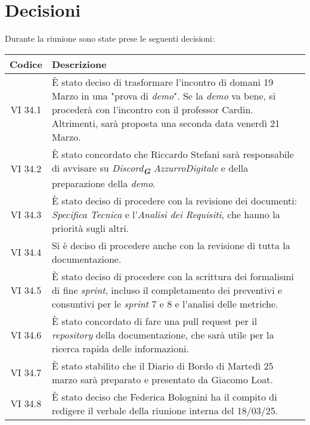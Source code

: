 
\section{Decisioni}

Durante la riunione sono state prese le seguenti decisioni:

\vspace{0.5cm}

\begin{table}[htbp]
    \centering
    \begin{tabular}{|c|p{}|}
        \hline
        \rowcolor[gray]{0.75}
        \textbf{Codice} & \textbf{Descrizione}\\
        \hline
        VI 34.1 & È stato deciso di trasformare l'incontro di domani 19 Marzo in una "prova di \emph{demo}". Se la \emph{demo} va bene, si procederà con l'incontro con il professor Cardin. Altrimenti, sarà proposta una seconda data venerdì 21 Marzo.\\
        \hline
        VI 34.2 & È stato concordato che Riccardo Stefani sarà responsabile di avvisare su \emph{Discord}\textsubscript{\textit{\textbf{G}}} \emph{AzzurroDigitale} e della preparazione della \emph{demo}.\\
        \hline
        VI 34.3 & È stato deciso di procedere con la revisione dei documenti: \emph{Specifica Tecnica} e l'\emph{Analisi dei Requisiti}, che hanno la priorità sugli altri.\\
        \hline 
        VI 34.4 & Si è deciso di procedere anche con la revisione di tutta la documentazione.\\
        \hline
        VI 34.5 & È stato deciso di procedere con la scrittura dei formalismi di fine \emph{sprint}, incluso il completamento dei preventivi e consuntivi per le \emph{sprint} 7 e 8 e l'analisi delle metriche.\\
        \hline
        VI 34.6 & È stato concordato di fare una pull request per il \emph{repository} della documentazione, che sarà utile per la ricerca rapida delle informazioni.\\
        \hline
        VI 34.7 & È stato stabilito che il Diario di Bordo di Martedì 25 marzo sarà preparato e presentato da Giacomo Loat.\\
        \hline
        VI 34.8 & È stato deciso che Federica Bolognini ha il compito di redigere il verbale della riunione interna del 18/03/25.\\

\end{tabular}
\end{table}

